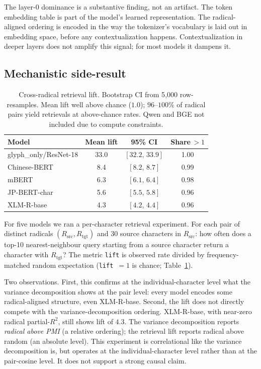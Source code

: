 \documentclass[11pt,a4paper,twocolumn]{article}
\begin{document}
The layer-0 dominance is a substantive finding, not an artifact. The
token embedding table is part of the model's learned representation.
The radical-aligned ordering is encoded in the way the tokenizer's
vocabulary is laid out in embedding space, before any contextualization
happens. Contextualization in deeper layers does not amplify this
signal; for most models it dampens it.

\subsection{Mechanistic side-result}

\begin{table}[t!]
\centering
\caption{Cross-radical retrieval lift. Bootstrap CI from 5{,}000
row-resamples. Mean lift well above chance ($1.0$); $96\text{--}100\%$
of radical pairs yield retrievals at above-chance rates. Qwen and BGE
not included due to compute constraints.}
\label{tab:patching}
\footnotesize
\setlength{\tabcolsep}{4pt}
\begin{tabular}{lccc}
\toprule
\textbf{Model} & \textbf{Mean lift} & \textbf{95\% CI} & \textbf{Share$\,>\!1$}\\
\midrule
glyph\_only/ResNet-18 & 33.0 & $[32.2,\,33.9]$ & 1.00 \\
Chinese-BERT          &  8.4 & $[8.2,\,8.7]$   & 0.99 \\
mBERT                 &  6.3 & $[6.1,\,6.4]$   & 0.98 \\
JP-BERT-char          &  5.6 & $[5.5,\,5.8]$   & 0.96 \\
XLM-R-base            &  4.3 & $[4.2,\,4.4]$   & 0.96 \\
\bottomrule
\end{tabular}
\end{table}

For five models we ran a per-character retrieval experiment. For each
pair of distinct radicals $(R_{\text{src}}, R_{\text{tgt}})$ and 30
source characters in $R_{\text{src}}$: how often does a top-10
nearest-neighbour query starting from a source character return a
character with $R_{\text{tgt}}$? The metric \texttt{lift} is observed
rate divided by frequency-matched random expectation
(\texttt{lift}~$=\!1$ is chance; Table~\ref{tab:patching}).

Two observations. First, this confirms at the individual-character
level what the variance decomposition shows at the pair level: every
model encodes some radical-aligned structure, even XLM-R-base.
Second, the lift does not directly compete with the
variance-decomposition ordering. XLM-R-base, with near-zero radical
partial-$R^2$, still shows lift of $4.3$. The variance decomposition
reports \emph{radical above PMI} (a relative ordering); the retrieval
lift reports radical above random (an absolute level). This experiment
is correlational like the variance decomposition is, but operates at
the individual-character level rather than at the pair-cosine level.
It does not support a strong causal claim.
\end{document}
